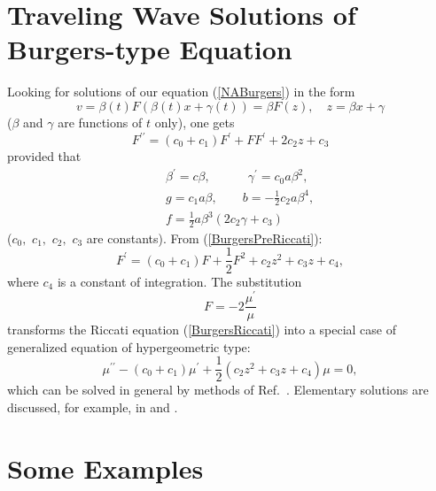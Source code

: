 \documentclass[12pt,reqno]{amsart}
\theoremstyle{plain}
\numberwithin{equation}{section}
\begin{document}
\section{Traveling Wave Solutions of Burgers-type Equation}

Looking for solutions of our equation (\ref{NABurgers}) in the form\begin{equation}
v=\beta \left( t\right) F\left( \beta \left( t\right) x+\gamma \left(
t\right) \right) =\beta F\left( z\right) ,\quad z=\beta x+\gamma 
\label{BurgersSubst}
\end{equation}($\beta $ and $\gamma $ are functions of $t$ only), one gets\begin{equation}
F^{\prime \prime }=\left( c_{0}+c_{1}\right) F^{\prime }+FF^{\prime
}+2c_{2}z+c_{3}  \label{BurgersPreRiccati}
\end{equation}provided that\begin{eqnarray}
&&\beta ^{\prime }=c\beta ,\qquad \quad \gamma ^{\prime }=c_{0}a\beta ^{2},
\label{BSysA} \\
&&g=c_{1}a\beta ,\qquad b=-\frac{1}{2}c_{2}a\beta ^{4},  \label{BSysB} \\
&&f=\frac{1}{2}a\beta ^{3}\left( 2c_{2}\gamma +c_{3}\right)   \label{BSysC}
\end{eqnarray}($c_{0},$ $c_{1},$ $c_{2},$ $c_{3}$ are constants). From (\ref{BurgersPreRiccati}):\begin{equation}
F^{\prime }=\left( c_{0}+c_{1}\right) F+\frac{1}{2}F^{2}+c_{2}z^{2}+c_{3}z+c_{4},  \label{BurgersRiccati}
\end{equation}where $c_{4}$ is a constant of integration. The substitution\begin{equation}
F=-2\frac{\mu ^{\prime }}{\mu }  \label{RiccatiSubstitution}
\end{equation}transforms the Riccati equation (\ref{BurgersRiccati}) into a special case
of generalized equation of hypergeometric type:\begin{equation}
\mu ^{\prime \prime }-\left( c_{0}+c_{1}\right) \mu ^{\prime }+\frac{1}{2}\left( c_{2}z^{2}+c_{3}z+c_{4}\right) \mu =0,  \label{NUEquation}
\end{equation}which can be solved in general by methods of Ref.~\cite{Ni:Uv}. Elementary
solutions are discussed, for example, in \cite{KudryashovBook10} and \cite{Kudryash:Sine09}.

\section{Some Examples}
\end{document}
